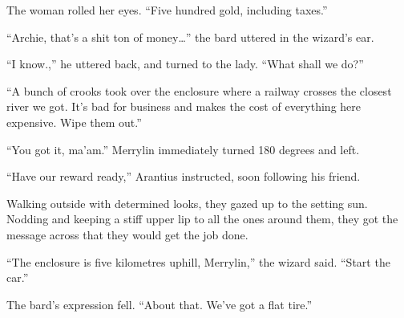 The woman rolled her eyes. “Five hundred gold, including taxes.”

“Archie, that’s a shit ton of money…” the bard uttered in the wizard’s ear.

“I know.,” he uttered back, and turned to the lady. “What shall we do?”

“A bunch of crooks took over the enclosure where a railway crosses the closest river we got. It’s bad for business and makes the cost of everything here expensive. Wipe them out.”

“You got it, ma’am.” Merrylin immediately turned 180 degrees and left.

“Have our reward ready,” Arantius instructed, soon following his friend.

Walking outside with determined looks, they gazed up to the setting sun. Nodding and keeping a stiff upper lip to all the ones around them, they got the message across that they would get the job done.

“The enclosure is five kilometres uphill, Merrylin,” the wizard said. “Start the car.”

The bard’s expression fell. “About that. We’ve got a flat tire.”
